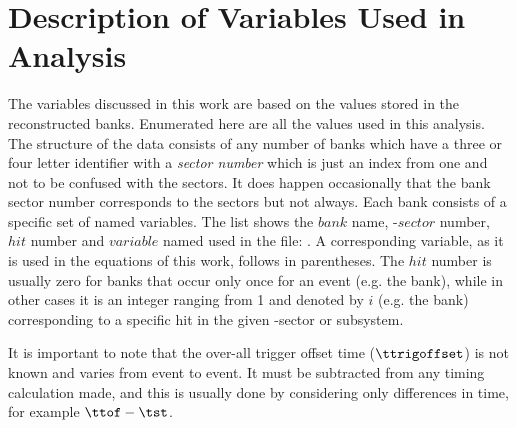 \section{\label{sec:data.variables}Description of Variables Used in Analysis}

The variables discussed in this work are based on the values stored in the reconstructed  banks. Enumerated here are all the values used in this analysis. The structure of the data consists of any number of banks which have a three or four letter identifier with a \emph{sector number} which is just an index from one and not to be confused with the  sectors. It does happen occasionally that the bank sector number corresponds to the  sectors but not always. Each bank consists of a specific set of named variables. The list shows the $bank$ name, -$sector$ number, $hit$ number and $variable$ named used in the  file: . A corresponding variable, as it is used in the equations of this work, follows in parentheses. The $hit$ number is usually zero for banks that occur only once for an event (e.g. the  bank), while in other cases it is an integer ranging from 1 and denoted by $i$ (e.g. the  bank) corresponding to a specific hit in the given -sector or subsystem.

It is important to note that the over-all trigger offset time ($\ttrigoffset$) is not known and varies from event to event. It must be subtracted from any timing calculation made, and this is usually done by considering only differences in time, for example $\ttof - \tst$.

